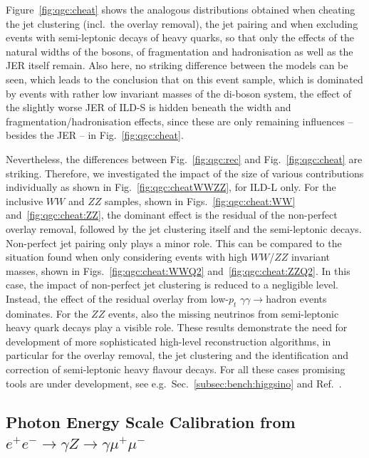 Figure~\ref{fig:qgc:cheat} shows the analogous distributions obtained when cheating the jet clustering (incl.\ the overlay removal), the jet pairing and when excluding events with semi-leptonic decays of heavy quarks, so that only the effects of the natural widths of the bosons, of fragmentation and hadronisation as well as the JER itself remain. Also here, no striking difference between the models can be seen, which leads to the conclusion that on this event sample, which is dominated by events with rather low invariant masses of the di-boson system, the effect of the slightly worse JER of ILD-S is hidden beneath the width and fragmentation/hadronisation effects, since these are only remaining influences -- besides the JER -- in Fig.~\ref{fig:qgc:cheat}.


Nevertheless, the differences between Fig.~\ref{fig:qgc:rec} and Fig.~\ref{fig:qgc:cheat} are striking. Therefore, we investigated the impact of the size of various contributions individually as shown in Fig.~\ref{fig:qgc:cheatWWZZ}, for ILD-L only. For the inclusive $WW$ and $ZZ$ samples, shown in Figs.~\ref{fig:qgc:cheat:WW} and~\ref{fig:qgc:cheat:ZZ}, the dominant effect is the residual of the non-perfect overlay removal, followed by the jet clustering itself and the semi-leptonic decays. Non-perfect jet pairing only plays a minor role. This can be compared to the situation found when only considering events with high $WW$/$ZZ$ invariant masses, shown in Figs.~\ref{fig:qgc:cheat:WWQ2} and~\ref{fig:qgc:cheat:ZZQ2}. In this case, the impact of non-perfect jet clustering is reduced to a negligible level. Instead, the effect of the residual overlay from low-$p_t$ $\gamma \gamma \to $hadron events dominates. For the $ZZ$ events, also the missing neutrinos from semi-leptonic heavy quark decays play a visible role. 
These results demonstrate the need for development of more sophisticated high-level reconstruction algorithms, in particular for the overlay removal, the jet clustering and the identification and correction of semi-leptonic heavy flavour decays. For all these cases promising tools are under development, see e.g.\ Sec.~\ref{subsec:bench:higgsino} and Ref.~\cite{Boronat:2014hva}.

\subsection{Photon Energy Scale Calibration from \texorpdfstring{$e^+e^- \to \gamma Z \to \gamma \mu^+\mu^-$}{e+e- -> aZ -> mumu}}
\label{subsec:bench:gammaZ}


